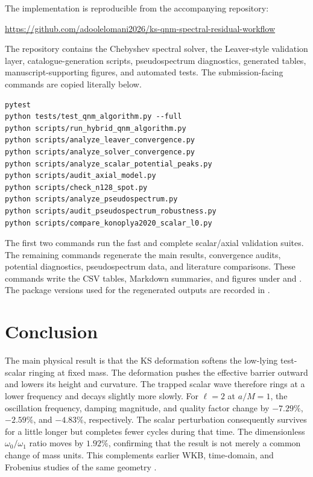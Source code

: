 \documentclass[12pt,a4paper]{article}
\begin{document}
The implementation is reproducible from the accompanying repository:
\begin{center}
\url{https://github.com/adoolelomani2026/ks-qnm-spectral-residual-workflow}
\end{center}
\color{blue}
The repository contains the Chebyshev spectral solver, the Leaver-style validation layer, catalogue-generation scripts, pseudospectrum diagnostics, generated tables, manuscript-supporting figures, and automated tests. The submission-facing commands are copied literally below.
\begin{verbatim}
pytest
python tests/test_qnm_algorithm.py --full
python scripts/run_hybrid_qnm_algorithm.py
python scripts/analyze_leaver_convergence.py
python scripts/analyze_solver_convergence.py
python scripts/analyze_scalar_potential_peaks.py
python scripts/audit_axial_model.py
python scripts/check_n128_spot.py
python scripts/analyze_pseudospectrum.py
python scripts/audit_pseudospectrum_robustness.py
python scripts/compare_konoplya2020_scalar_l0.py
\end{verbatim}
The first two commands run the fast and complete scalar/axial validation
suites.  The remaining commands regenerate the main results, convergence
audits, potential diagnostics, pseudospectrum data, and literature comparisons.
\color{black}
These commands write the CSV tables, Markdown summaries, and figures under  and . The package versions used for the regenerated outputs are recorded in .

\section{Conclusion}

\color{blue}
The main physical result is that the KS deformation softens the low-lying
test-scalar ringing at fixed mass.  The deformation pushes the effective
barrier outward and lowers its height and curvature.  The trapped scalar wave
therefore rings at a lower frequency and decays slightly more slowly.  For
\(\ell=2\) at \(a/M=1\), the oscillation frequency, damping magnitude, and
quality factor change by \(-7.29\%\), \(-2.59\%\), and \(-4.83\%\),
respectively.  The scalar perturbation consequently survives for a little
longer but completes fewer cycles during that time.  The dimensionless
\(\omega_0/\omega_1\) ratio moves by \(1.92\%\), confirming that the result is
not merely a common change of mass units.  This complements earlier WKB,
time-domain, and Frobenius studies of the same geometry
\cite{Konoplya2020,Bolokhov2025}.
\color{black}
\end{document}
